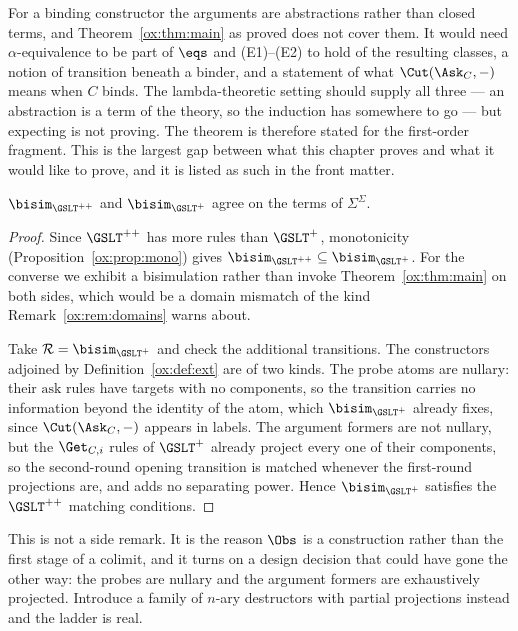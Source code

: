 \begin{remark}
\label{ox:rem:binding}
For a binding constructor the arguments are abstractions rather than closed terms,
and Theorem~\ref{ox:thm:main} as proved does not cover them. It would need
$\alpha$-equivalence to be part of $\eqs$ and (E1)--(E2) to hold of the resulting
classes, a notion of transition beneath a binder, and a statement of what
$\Cut(\Ask_C,-)$ means when $C$ binds. The lambda-theoretic setting should supply
all three --- an abstraction is a term of the theory, so the induction has
somewhere to go --- but expecting is not proving. The theorem is therefore stated
for the first-order fragment. This is the largest gap between what this chapter
proves and what it would like to prove, and it is listed as such in the front
matter.
\end{remark}

\begin{proposition}[Idempotence]
\label{ox:prop:idem}
$\bisim_{\GSLT^{++}}$ and $\bisim_{\GSLT^{+}}$ agree on the terms of
$\Sigma^{\Sigma}$.
\end{proposition}

\begin{proof}
Since $\GSLT^{++}$ has more rules than $\GSLT^{+}$, monotonicity
(Proposition~\ref{ox:prop:mono}) gives
$\bisim_{\GSLT^{++}} \subseteq \bisim_{\GSLT^{+}}$. For the converse we exhibit a
bisimulation rather than invoke Theorem~\ref{ox:thm:main} on both sides, which
would be a domain mismatch of the kind Remark~\ref{ox:rem:domains} warns about.

Take $\mathcal{R} = \bisim_{\GSLT^{+}}$ and check the additional transitions. The
constructors adjoined by Definition~\ref{ox:def:ext} are of two kinds. The probe
atoms are nullary: their $\mathrm{ask}$ rules have targets with no components, so
the transition carries no information beyond the identity of the atom, which
$\bisim_{\GSLT^{+}}$ already fixes, since $\Cut(\Ask_C,-)$ appears in labels. The
argument formers are not nullary, but the $\Get_{C,i}$ rules of $\GSLT^{+}$ already
project every one of their components, so the second-round opening transition is
matched whenever the first-round projections are, and adds no separating power.
Hence $\bisim_{\GSLT^{+}}$ satisfies the $\GSLT^{++}$ matching conditions.
\end{proof}

This is not a side remark. It is the reason $\Obs$ is a construction rather than
the first stage of a colimit, and it turns on a design decision that could have
gone the other way: the probes are nullary and the argument formers are
exhaustively projected. Introduce a family of $n$-ary destructors with partial
projections instead and the ladder is real.

